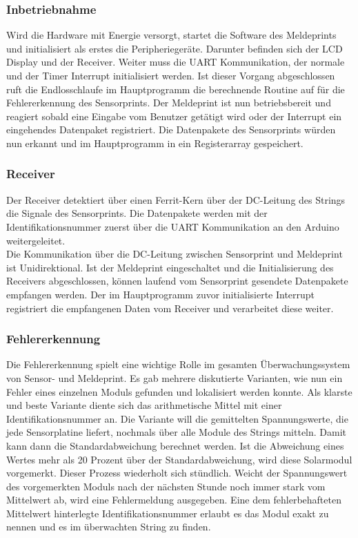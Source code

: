 \subsubsection{Inbetriebnahme}
Wird die Hardware mit Energie versorgt, startet die Software des Meldeprints und initialisiert als erstes die Peripheriegeräte. Darunter befinden sich der LCD Display und der Receiver. Weiter muss die UART Kommunikation, der normale und der Timer Interrupt initialisiert werden. Ist dieser Vorgang abgeschlossen ruft die Endlosschlaufe im Hauptprogramm die berechnende Routine auf für die Fehlererkennung des Sensorprints. Der Meldeprint ist nun betriebsbereit und reagiert sobald eine Eingabe vom Benutzer getätigt wird oder der Interrupt ein eingehendes Datenpaket registriert. Die Datenpakete des Sensorprints würden nun erkannt und im Hauptprogramm in ein Registerarray gespeichert.
\subsubsection{Receiver}
Der Receiver detektiert über einen Ferrit-Kern über der DC-Leitung des Strings die Signale des Sensorprints. Die Datenpakete werden mit der Identifikationsnummer zuerst über die UART Kommunikation an den Arduino weitergeleitet.\\
Die Kommunikation über die DC-Leitung zwischen Sensorprint und Meldeprint ist Unidirektional. Ist der Meldeprint eingeschaltet und die Initialisierung des Receivers abgeschlossen, können laufend vom Sensorprint gesendete Datenpakete empfangen werden. Der im Hauptprogramm zuvor initialisierte Interrupt registriert die empfangenen Daten vom Receiver und verarbeitet diese weiter.
\subsubsection{Fehlererkennung}
Die Fehlererkennung spielt eine wichtige Rolle im gesamten Überwachungssystem von Sensor- und Meldeprint. Es gab mehrere diskutierte Varianten, wie nun ein Fehler eines einzelnen Moduls gefunden und lokalisiert werden konnte. Als klarste und beste Variante diente sich das arithmetische Mittel mit einer Identifikationsnummer an. Die Variante will die gemittelten Spannungswerte, die jede Sensorplatine liefert, nochmals über alle Module des Strings mitteln. Damit kann dann die Standardabweichung berechnet werden. Ist die Abweichung eines Wertes mehr als 20 Prozent über der Standardabweichung, wird diese Solarmodul vorgemerkt. Dieser Prozess  wiederholt sich stündlich. Weicht der Spannungswert des vorgemerkten Moduls nach der nächsten Stunde noch immer stark vom Mittelwert ab, wird eine Fehlermeldung ausgegeben. Eine dem fehlerbehafteten Mittelwert hinterlegte Identifikationsnummer erlaubt es das Modul exakt zu nennen und es im überwachten String zu finden.
